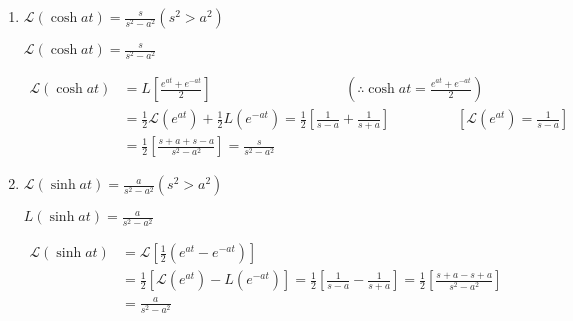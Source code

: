 \begin{enumerate}
	\item $\mathcal{L}(\cosh a t)=\frac{s}{s^{2}-a^{2}}\left(s^{2}>a^{2}\right)$
		\begin{exercise}
		$\mathcal{L}(\cosh a t)=\frac{s}{s^{2}-a^{2}}$
	\end{exercise}
	\begin{answer}
		\begin{align*}
		\mathcal{L}(\cosh a t) &=L\left[\frac{e^{a t}+e^{-a t}}{2}\right] \hspace{4cm}\left(\therefore \cosh a t=\frac{e^{a t}+e^{-a t}}{2}\right)\\
		&=\frac{1}{2} \mathcal{L}\left(e^{a t}\right)+\frac{1}{2} L\left(e^{-a t}\right)=\frac{1}{2}\left[\frac{1}{s-a}+\frac{1}{s+a}\right] \hspace{2cm}\left[\mathcal{L}\left(e^{a t}\right)=\frac{1}{s-a}\right]\\
		&=\frac{1}{2}\left[\frac{s+a+s-a}{s^{2}-a^{2}}\right]=\frac{s}{s^{2}-a^{2}}
		\end{align*}
	\end{answer}
	\item $\mathcal{L}(\sinh a t)=\frac{a}{s^{2}-a^{2}}\left(s^{2}>a^{2}\right)$
	\begin{exercise}
		$L(\sinh a t)=\frac{a}{s^{2}-a^{2}}$
	\end{exercise}
	\begin{answer}
		\begin{align*}
		\mathcal{L}(\sinh a t) &=\mathcal{L}\left[\frac{1}{2}\left(e^{a t}-e^{-a t}\right)\right] \\
		&=\frac{1}{2}\left[\mathcal{L}\left(e^{a t}\right)-L\left(e^{-a t}\right)\right]=\frac{1}{2}\left[\frac{1}{s-a}-\frac{1}{s+a}\right]=\frac{1}{2}\left[\frac{s+a-s+a}{s^{2}-a^{2}}\right] \\
		&=\frac{a}{s^{2}-a^{2}}
		\end{align*}
	\end{answer}
\end{enumerate}

